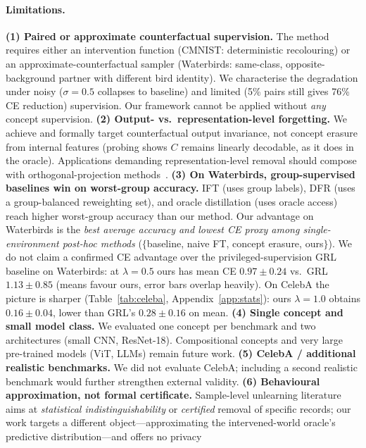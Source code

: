 \documentclass{article}
\begin{document}
\paragraph{Limitations.}
\textbf{(1) Paired or approximate counterfactual supervision.}  The method
requires either an intervention function (CMNIST: deterministic recolouring) or
an approximate-counterfactual sampler (Waterbirds: same-class, opposite-background
partner with different bird identity).  We characterise the degradation under
noisy ($\sigma{=}0.5$ collapses to baseline) and limited (5\% pairs still gives
76\% CE reduction) supervision.  Our framework cannot be applied without
\emph{any} concept supervision.
\textbf{(2) Output- vs.\ representation-level forgetting.}  We achieve and
formally target counterfactual output invariance, not concept erasure from
internal features (probing shows $C$ remains linearly decodable, as it does in
the oracle).  Applications demanding representation-level removal should
compose with orthogonal-projection methods~\cite{belrose2023concept}.
\textbf{(3) On Waterbirds, group-supervised baselines win on worst-group accuracy.}
IFT (uses group labels), DFR (uses a group-balanced reweighting set), and
oracle distillation (uses oracle access) reach higher worst-group accuracy
than our method.  Our advantage on Waterbirds is the
\emph{best average accuracy and lowest CE proxy among single-environment
post-hoc methods} ($\{$baseline, naive FT, concept erasure, ours$\}$).
We do not claim a confirmed CE advantage over the privileged-supervision
GRL baseline on Waterbirds: at $\lambda{=}0.5$ ours has mean CE $0.97 \pm 0.24$
vs.\ GRL $1.13 \pm 0.85$ (means favour ours, error bars overlap heavily).
On CelebA the picture is sharper (Table~\ref{tab:celeba}, Appendix~\ref{app:stats}):
ours $\lambda{=}1.0$ obtains $0.16 \pm 0.04$, lower than GRL's $0.28 \pm 0.16$
on mean.
\textbf{(4) Single concept and small model class.}  We evaluated one concept
per benchmark and two architectures (small CNN, ResNet-18).  Compositional
concepts and very large pre-trained models (ViT, LLMs) remain future work.
\textbf{(5) CelebA / additional realistic benchmarks.}  We did not evaluate
CelebA; including a second realistic benchmark would further strengthen
external validity.
\textbf{(6) Behavioural approximation, not formal certificate.}
Sample-level unlearning literature
\cite{cao2015machine,guo2020certified,sekhari2021remember} aims at
\emph{statistical indistinguishability} or \emph{certified} removal of
specific records; our work targets a different object---approximating the
intervened-world oracle's predictive distribution---and offers no privacy
\end{document}
